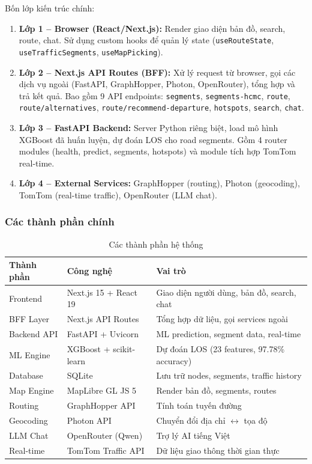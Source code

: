\documentclass[12pt,a4paper]{article}
\begin{document}
Bốn lớp kiến trúc chính:
\begin{enumerate}[leftmargin=1.2cm]
    \item \textbf{Lớp 1 -- Browser (React/Next.js):} Render giao diện bản đồ, search, route, chat. Sử dụng custom hooks để quản lý state (\texttt{useRouteState}, \texttt{useTrafficSegments}, \texttt{useMapPicking}).
    \item \textbf{Lớp 2 -- Next.js API Routes (BFF):} Xử lý request từ browser, gọi các dịch vụ ngoài (FastAPI, GraphHopper, Photon, OpenRouter), tổng hợp và trả kết quả. Bao gồm 9 API endpoints: \texttt{segments}, \texttt{segments-hcmc}, \texttt{route}, \texttt{route/alternatives}, \texttt{route/recommend-departure}, \texttt{hotspots}, \texttt{search}, \texttt{chat}.
    \item \textbf{Lớp 3 -- FastAPI Backend:} Server Python riêng biệt, load mô hình XGBoost đã huấn luyện, dự đoán LOS cho road segments. Gồm 4 router modules (health, predict, segments, hotspots) và module tích hợp TomTom real-time.
    \item \textbf{Lớp 4 -- External Services:} GraphHopper (routing), Photon (geocoding), TomTom (real-time traffic), OpenRouter (LLM chat).
\end{enumerate}

\subsubsection{Các thành phần chính}
\begin{table}[H]
\centering
\caption{Các thành phần hệ thống}
\begin{tabularx}{\textwidth}{L{3cm}L{3.2cm}Y}
\toprule
\textbf{Thành phần} & \textbf{Công nghệ} & \textbf{Vai trò} \\
\midrule
Frontend & Next.js 15 + React 19 & Giao diện người dùng, bản đồ, search, chat \\[4pt]
BFF Layer & Next.js API Routes & Tổng hợp dữ liệu, gọi services ngoài \\[4pt]
Backend API & FastAPI + Uvicorn & ML prediction, segment data, real-time \\[4pt]
ML Engine & XGBoost + scikit-learn & Dự đoán LOS (23 features, 97.78\% accuracy) \\[4pt]
Database & SQLite & Lưu trữ nodes, segments, traffic history \\[4pt]
Map Engine & MapLibre GL JS 5 & Render bản đồ, segments, routes \\[4pt]
Routing & GraphHopper API & Tính toán tuyến đường \\[4pt]
Geocoding & Photon API & Chuyển đổi địa chỉ $\leftrightarrow$ tọa độ \\[4pt]
LLM Chat & OpenRouter (Qwen) & Trợ lý AI tiếng Việt \\[4pt]
Real-time & TomTom Traffic API & Dữ liệu giao thông thời gian thực \\
\bottomrule
\end{tabularx}
\end{table}
\end{document}
